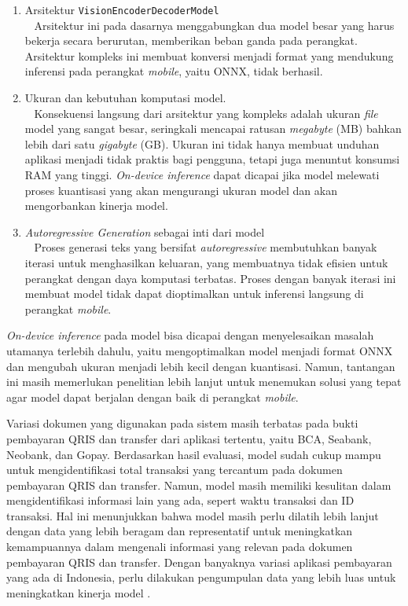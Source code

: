 \begin{enumerate}
    \item Arsitektur \texttt{VisionEncoderDecoderModel} \\~
    Arsitektur ini pada dasarnya menggabungkan dua model besar yang harus bekerja secara berurutan, memberikan beban ganda pada perangkat. Arsitektur kompleks ini membuat konversi \donut{} menjadi format yang mendukung inferensi pada perangkat \emph{mobile}, yaitu ONNX, tidak berhasil. 

    \item Ukuran dan kebutuhan komputasi model. \\~ Konsekuensi langsung dari arsitektur yang kompleks adalah ukuran \emph{file} model yang sangat besar, seringkali mencapai ratusan \emph{megabyte} (MB) bahkan lebih dari satu \emph{gigabyte} (GB). Ukuran ini tidak hanya membuat unduhan aplikasi menjadi tidak praktis bagi pengguna, tetapi juga menuntut konsumsi RAM yang tinggi. \emph{On-device inference} dapat dicapai jika model melewati proses kuantisasi yang akan mengurangi ukuran model dan akan mengorbankan kinerja model.

    \item \emph{Autoregressive Generation} sebagai inti dari model \donut
    \\~
    Proses generasi teks yang bersifat \emph{autoregressive} membutuhkan banyak iterasi untuk menghasilkan keluaran, yang membuatnya tidak efisien untuk perangkat dengan daya komputasi terbatas. Proses dengan banyak iterasi ini membuat model \donut{} tidak dapat dioptimalkan untuk inferensi langsung di perangkat \emph{mobile}. 
\end{enumerate}

\emph{On-device inference} pada model \donut{} bisa dicapai dengan menyelesaikan masalah utamanya terlebih dahulu, yaitu mengoptimalkan model menjadi format ONNX dan mengubah ukuran menjadi lebih kecil dengan kuantisasi. Namun, tantangan ini masih memerlukan penelitian lebih lanjut untuk menemukan solusi yang tepat agar model dapat berjalan dengan baik di perangkat \emph{mobile}.

Variasi dokumen yang digunakan pada sistem masih terbatas pada bukti pembayaran QRIS dan transfer dari aplikasi tertentu, yaitu BCA, Seabank, Neobank, dan Gopay. Berdasarkan hasil evaluasi, model \donut{} sudah cukup mampu untuk mengidentifikasi total transaksi yang tercantum pada dokumen pembayaran QRIS dan transfer. Namun, model masih memiliki kesulitan dalam mengidentifikasi informasi lain yang ada, sepert waktu transaksi dan ID transaksi. Hal ini menunjukkan bahwa model masih perlu dilatih lebih lanjut dengan data yang lebih beragam dan representatif untuk meningkatkan kemampuannya dalam mengenali informasi yang relevan pada dokumen pembayaran QRIS dan transfer. Dengan banyaknya variasi aplikasi pembayaran yang ada di Indonesia, perlu dilakukan pengumpulan data yang lebih luas untuk meningkatkan kinerja model \donut{}.

